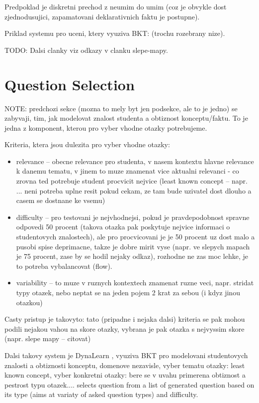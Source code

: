 \documentclass[a4paper, 12pt, twoside]{fithesis2}		%
\renewcommand{\_}{\leavevmode \kern0.07em\vbox{\hrule width0.4em}}
\newcommand{\squarebullet}{\textcolor{black}{\raisebox{0.15em}{\rule{4pt}{4pt}}}}
\newcommand{\emptysquarebullet}{\textcolor{black}{\raisebox{0.10em}{\tiny$\square$}}}
\newenvironment{myItemize}{
  \begin{itemize}[leftmargin=2em,rightmargin=1em,itemsep=\parskip ,parsep=0em,topsep=0em,partopsep=0em]
  \renewcommand{\labelitemi}{\squarebullet}
  \renewcommand{\labelitemii}{\textbullet}
}{
  \end{itemize}
}
\begin{document}
Predpoklad je diskretni prechod z neumim do umim (coz je obvykle dost zjednodusujici, zapamatovani deklarativnich faktu je postupne).

Priklad systemu pro uceni, ktery vyuziva BKT: \cite{question-gen-adapt-bayes} (trochu rozebrany nize).

TODO: Dalsi clanky viz odkazy v clanku slepe-mapy.


\section{Question Selection}
\label{sec:question-selection}

NOTE: predchozi sekce (mozna to mely byt jen podsekce, ale to je jedno) se zabyvaji, tim, jak modelovat znalost studenta a obtiznost konceptu/faktu. To je jedna z komponent, kterou pro vyber vhodne otazky potrebujeme.

Kriteria, ktera jsou dulezita pro vyber vhodne otazky:

\begin{myItemize}
  \item relevance -- obecne relevance pro studenta, v nasem kontextu hlavne relevance k danemu tematu, v jinem to muze znamenat vice aktualni relevanci - co zrovna ted potrebuje student procvicit nejvice (least known concept -- napr. \cite{question-gen-adapt-bayes} ... neni potreba uplne resit pokud cekam, ze tam bude uzivatel dost dlouho a casem se dostnane ke vsemu)
  \item difficulty -- pro testovani je nejvhodnejsi, pokud je pravdepodobnost spravne odpovedi 50 procent (takova otazka pak poskytuje nejvice informaci o studentovych znalostech), ale pro procvicovani je je 50 procent uz dost malo a pusobi spise deprimacne, takze je dobre mirit vyse (napr. ve slepych mapach je 75 procent, zase by se hodil nejaky odkaz), rozhodne ne zas moc lehke, je to potreba vybalancovat (flow).
  \item variability -- to muze v ruznych kontextech znamenat ruzne veci, napr. stridat typy otazek, nebo neptat se na jeden pojem 2 krat za sebou (i kdyz jinou otazkou)
\end{myItemize}

Casty pristup je takovyto: tato (pripadne i nejaka dalsi) kriteria se pak mohou podili nejakou vahou na skore otazky, vybrana je pak otazka s nejvyssim skore (napr. slepe mapy -- citovat)

Dalsi takovy system je
DynaLearn \cite{question-gen-adapt-bayes}, vyuziva BKT pro modelovani studentovych znalosti a obtiznosti konceptu,  domenove nezavisle, vyber tematu otazky: least known concept, vyber konkretni otazky: bere se v uvahu primerena obtiznost a pestrost typu otazek....
selects question from a list of generated question based on its type (aims at variaty of asked question types) and difficulty.
\end{document}
